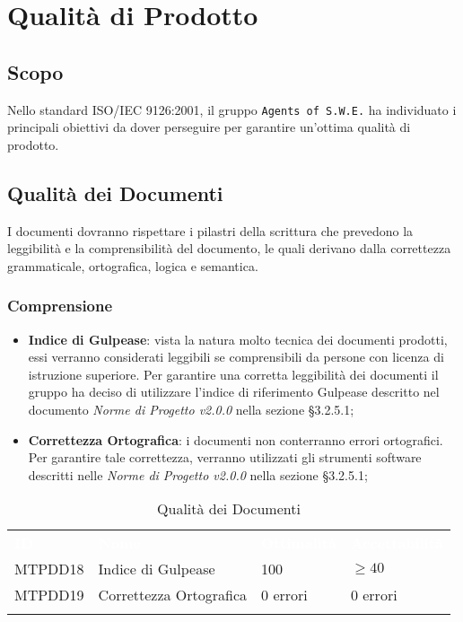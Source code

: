 \section{Qualità di Prodotto}
\label{qualitaProdotto}

\subsection{Scopo}

Nello standard ISO/IEC 9126:2001, il gruppo \texttt{Agents of S.W.E.} ha individuato i principali obiettivi da dover perseguire per garantire un'ottima qualità di prodotto.  

\subsection{Qualità dei Documenti}

I documenti dovranno rispettare i pilastri della scrittura che prevedono la leggibilità e la comprensibilità del documento, le quali derivano dalla correttezza grammaticale, ortografica, logica e semantica.

\subsubsection{Comprensione}

\begin{itemize}
	\item \textbf{Indice di Gulpease}: vista la natura molto tecnica dei documenti prodotti, essi verranno considerati leggibili se comprensibili da persone con licenza di istruzione superiore. Per garantire una corretta leggibilità dei documenti il gruppo ha deciso di utilizzare l'indice di riferimento Gulpease descritto nel documento \textit{Norme di Progetto v2.0.0} nella sezione §3.2.5.1;
	
	\item \textbf{Correttezza Ortografica}: i documenti non conterranno errori ortografici. Per garantire tale correttezza, verranno utilizzati gli strumenti software descritti nelle \textit{Norme di Progetto v2.0.0} nella sezione §3.2.5.1;
	
\end{itemize}

\begin{longtable}{|C{.15\textwidth}|C{.24\textwidth}|C{.24\textwidth}|C{.24\textwidth}|}
\hline
{}\textbf{\textcolor{white}{ID}} & \textbf{\textcolor{white}{Nome}} & \textbf{\textcolor{white}{Ottimalità}} & \textbf{\textcolor{white}{Accettabilità}}\\
MTPDD18 & Indice di Gulpease & 100 & $\geq 40$ \\
\hline
{}MTPDD19 & Correttezza Ortografica & 0 errori & 0 errori \\ 
\hline
\caption{Qualità dei Documenti}
\label{QualitàDocumenti}
\end{longtable}

